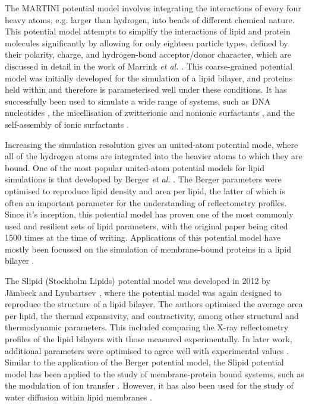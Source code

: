The MARTINI potential model involves integrating the interactions of every four heavy atoms, e.g. larger than hydrogen, into beads of different chemical nature.
This potential model attempts to simplify the interactions of lipid and protein molecules significantly by allowing for only eighteen particle types, defined by their polarity, charge, and hydrogen-bond acceptor/donor character, which are discussed in detail in the work of Marrink \emph{et al.} \cite{marrink_martini_2007}.
This coarse-grained potential model was initially developed for the simulation of a lipid bilayer, and proteins held within and therefore is parameterised well under these conditions.
It has successfully been used to simulate a wide range of systems, such as DNA nucleotides \cite{uusitalo_martini_2015}, the micellisation of zwitterionic and nonionic surfactants \cite{sanders_micellization_2010}, and the self-assembly of ionic surfactants \cite{wang_coarse-grained_2015}.

Increasing the simulation resolution gives an united-atom potential mode, where all of the hydrogen atoms are integrated into the heavier atoms to which they are bound.
One of the most popular united-atom potential models for lipid simulations is that developed by Berger \emph{et al.} \cite{berger_molecular_1997}.
The Berger parameters were optimised to reproduce lipid density and area per lipid, the latter of which is often an important parameter for the understanding of reflectometry profiles.
Since it's inception, this potential model has proven one of the most commonly used and resilient sets of lipid parameters, with the original paper being cited 1500 times at the time of writing.
Applications of this potential model have mostly been focussed on the simulation of membrane-bound proteins in a lipid bilayer \cite{tieleman_membrane_2006,cordomi_membrane_2012}.

The Slipid (Stockholm Lipids) potential model was developed in 2012 by J\"{a}mbeck and Lyubartsev \cite{jambeck_derivation_2012}, where the potential model was again designed to reproduce the structure of a lipid bilayer.
The authors optimised the average area per lipid, the thermal expansivity, and contractivity, among other structural and thermodynamic parameters.
This included comparing the X-ray reflectometry profiles of the lipid bilayers with those measured experimentally.
In later work, additional parameters were optimised to agree well with experimental values \cite{jambeck_extension_2012,jambeck_another_2013}.
Similar to the application of the Berger potential model, the Slipid potential model has been applied to the study of membrane-protein bound systems, such as the modulation of ion transfer \cite{segala_controlling_2016}.
However, it has also been used for the study of water diffusion within lipid membranes \cite{von_hansen_anomalous_2013}.

